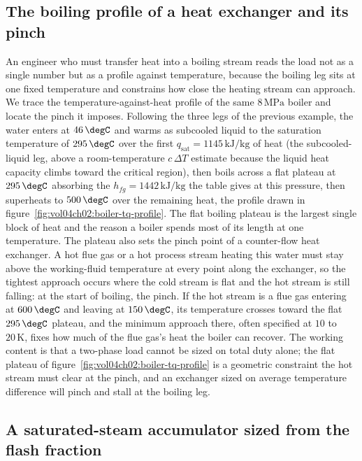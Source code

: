 \subsection{The boiling profile of a heat exchanger and its pinch}

An engineer who must transfer heat into a boiling stream reads the load not as
a single number but as a profile against temperature, because the boiling leg
sits at one fixed temperature and constrains how close the heating stream can
approach. We trace the temperature-against-heat profile of the same
$8\,\text{MPa}$ boiler and locate the pinch it imposes. Following the three
legs of the previous example, the water enters at $46\,\degC$ and warms as
subcooled liquid to the saturation temperature of $295\,\degC$ over the first
$q_{\text{sat}} = 1145\,\text{kJ}/\text{kg}$ of heat (the subcooled-liquid
leg, above a room-temperature $c\,\Delta T$ estimate because the liquid heat
capacity climbs toward the critical region), then boils across a flat plateau
at $295\,\degC$ absorbing the
$h_{fg} = 1442\,\text{kJ}/\text{kg}$ the table gives at this pressure, then
superheats to $500\,\degC$ over the remaining heat, the profile drawn in
figure~\ref{fig:vol04ch02:boiler-tq-profile}. The flat boiling plateau is the
largest single block of heat and the reason a boiler spends most of its length
at one temperature. The plateau also sets the pinch point of a counter-flow
heat exchanger. A hot flue gas or a hot process stream heating this water must
stay above the working-fluid temperature at every point along the exchanger, so
the tightest approach occurs where the cold stream is flat and the hot stream is
still falling: at the start of boiling, the pinch. If the hot stream is a flue
gas entering at $600\,\degC$ and leaving at $150\,\degC$, its temperature
crosses toward the flat $295\,\degC$ plateau, and the minimum approach there,
often specified at $10$ to $20\,\si{\kelvin}$, fixes how much of the flue gas's
heat the boiler can recover. The working content is that a two-phase load
cannot be sized on total duty alone; the flat plateau of
figure~\ref{fig:vol04ch02:boiler-tq-profile} is a geometric constraint the hot
stream must clear at the pinch, and an exchanger sized on average temperature
difference will pinch and stall at the boiling leg.



\subsection{A saturated-steam accumulator sized from the flash fraction}

